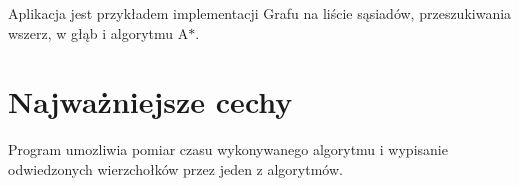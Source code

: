 \-Aplikacja jest przykładem implementacji \-Grafu na liście sąsiadów, przeszukiwania wszerz, w głąb i algorytmu \-A$\ast$.\hypertarget{index_etykieta-wazne-cechy}{}\section{\-Najważniejsze cechy}\label{index_etykieta-wazne-cechy}
\-Program umozliwia pomiar czasu wykonywanego algorytmu i wypisanie odwiedzonych wierzchołków przez jeden z algorytmów. 